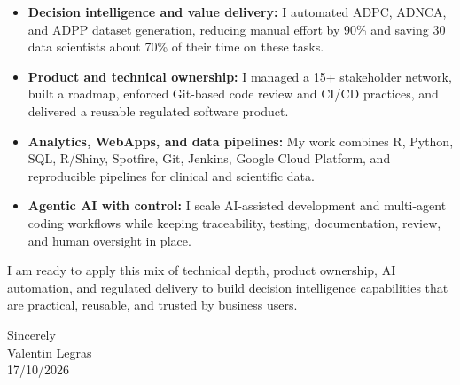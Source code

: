 \documentclass[11pt,a4paper]{article}
\newcommand{\SignDate}{17/10/2026}
\begin{document}
\begin{itemize}
  \item \textbf{Decision intelligence and value delivery:} I automated ADPC,
        ADNCA, and ADPP dataset generation, reducing manual effort by 90\% and
        saving 30 data scientists about 70\% of their time on these tasks.
  \item \textbf{Product and technical ownership:} I managed a 15+ stakeholder
        network, built a roadmap, enforced Git-based code review and CI/CD
        practices, and delivered a reusable regulated software product.
  \item \textbf{Analytics, WebApps, and data pipelines:} My work combines R,
        Python, SQL, R/Shiny, Spotfire, Git, Jenkins, Google Cloud Platform, and
        reproducible pipelines for clinical and scientific data.
  \item \textbf{Agentic AI with control:} I scale AI-assisted development and
        multi-agent coding workflows while keeping traceability, testing,
        documentation, review, and human oversight in place.
\end{itemize}

I am ready to apply this mix of technical depth, product ownership, AI
automation, and regulated delivery to build decision intelligence capabilities
that are practical, reusable, and trusted by business users.

\vspace{10pt}
Sincerely\\[6pt]
Valentin Legras\\
\SignDate{}
\end{document}
